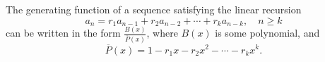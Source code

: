 

\setcounter{section}{2}
\setcounter{subsection}{3}
\setcounter{dfn}{10}

\begin{thm}
The generating function of a sequence satisfying the linear recursion
\[
a_n = r_1 a_{n-1} + r_2 a_{n-2} + \cdots + r_k a_{n-k}, \quad n \ge k
\]
can be written in the form $\frac{B(x)}{\overline{P}(x)}$, where $B(x)$ is some polynomial, and
\[
\overline{P}(x) = 1 - r_1 x - r_2 x^2 - \cdots - r_k x^k.
\]
\end{thm}

